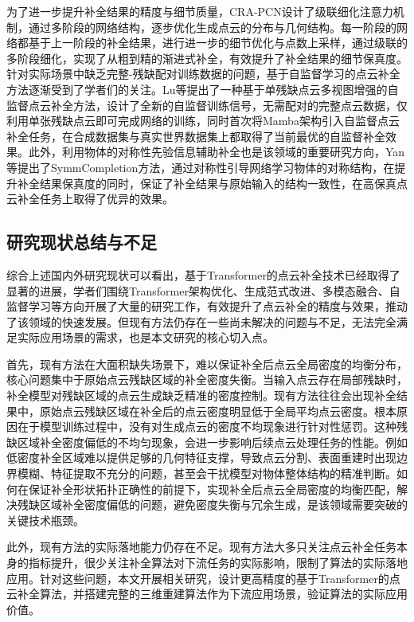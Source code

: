 为了进一步提升补全结果的精度与细节质量，CRA-PCN设计了级联细化注意力机制，通过多阶段的网络结构，逐步优化生成点云的分布与几何结构。每一阶段的网络都基于上一阶段的补全结果，进行进一步的细节优化与点数上采样，通过级联的多阶段细化，实现了从粗到精的渐进式补全，有效提升了补全结果的细节保真度\cite{yi2022crapcn}。针对实际场景中缺乏完整-残缺配对训练数据的问题，基于自监督学习的点云补全方法逐渐受到了学者们的关注。Lu等提出了一种基于单残缺点云多视图增强的自监督点云补全方法，设计了全新的自监督训练信号，无需配对的完整点云数据，仅利用单张残缺点云即可完成网络的训练，同时首次将Mamba架构引入自监督点云补全任务，在合成数据集与真实世界数据集上都取得了当前最优的自监督补全效果\cite{lu2025selfsupervised}。此外，利用物体的对称性先验信息辅助补全也是该领域的重要研究方向，Yan等提出了SymmCompletion方法，通过对称性引导网络学习物体的对称结构，在提升补全结果保真度的同时，保证了补全结果与原始输入的结构一致性，在高保真点云补全任务上取得了优异的效果\cite{yan2025symmcompletion}。

\subsection{研究现状总结与不足}
综合上述国内外研究现状可以看出，基于Transformer的点云补全技术已经取得了显著的进展，学者们围绕Transformer架构优化、生成范式改进、多模态融合、自监督学习等方向开展了大量的研究工作，有效提升了点云补全的精度与效果，推动了该领域的快速发展。但现有方法仍存在一些尚未解决的问题与不足，无法完全满足实际应用场景的需求，也是本文研究的核心切入点。

首先，现有方法在大面积缺失场景下，难以保证补全后点云全局密度的均衡分布，核心问题集中于原始点云残缺区域的补全密度失衡。当输入点云存在局部残缺时，补全模型对残缺区域的点云生成缺乏精准的密度控制。现有方法往往会出现补全结果中，原始点云残缺区域在补全后的点云密度明显低于全局平均点云密度。根本原因在于模型训练过程中，没有对生成点云的密度不均现象进行针对性惩罚。这种残缺区域补全密度偏低的不均匀现象，会进一步影响后续点云处理任务的性能。例如低密度补全区域难以提供足够的几何特征支撑，导致点云分割、表面重建时出现边界模糊、特征提取不充分的问题，甚至会干扰模型对物体整体结构的精准判断。如何在保证补全形状拓扑正确性的前提下，实现补全后点云全局密度的均衡匹配，解决残缺区域补全密度偏低的问题，避免密度失衡与冗余生成，是该领域需要突破的关键技术瓶颈。

此外，现有方法的实际落地能力仍存在不足。现有方法大多只关注点云补全任务本身的指标提升，很少关注补全算法对下流任务的实际影响，限制了算法的实际落地应用。针对这些问题，本文开展相关研究，设计更高精度的基于Transformer的点云补全算法，并搭建完整的三维重建算法作为下流应用场景，验证算法的实际应用价值。

